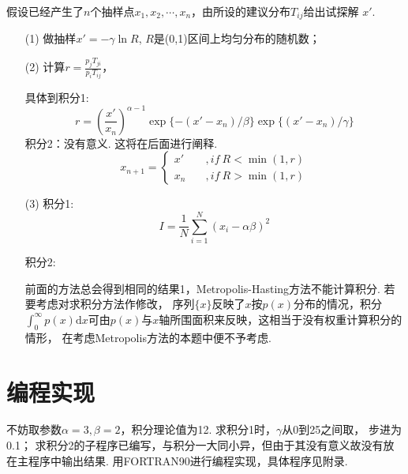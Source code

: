 \documentclass[12pt,a4paper,utf8]{ctexart}
\begin{document}
假设已经产生了$n$个抽样点$x_1,x_2,\cdots,x_n$，由所设的建议分布$T_{ij}$给出试探解
$x'$.
\begin{enumerate}
    \item[(1)] 做抽样$x'=-\gamma \ln R$, $R$是(0,1)区间上均匀分布的随机数；
    \item[(2)] 计算$r= \frac{p_jT_{ji}}{p_iT_{ij}}$，

        具体到积分1:
        \begin{equation}
            r = \left( \frac{x'}{x_n}\right)^{\alpha-1}\exp\{-(x'-x_n)/\beta\}
            \exp\{(x'-x_n)/\gamma\}
        \end{equation}
        积分2：没有意义. 这将在后面进行阐释. 
        \begin{equation}
            x_{n+1} = 
            \begin{cases}
                x' \quad&,if~R<\min(1,r)\\
                x_n \quad&,if~ R>\min(1,r)
            \end{cases}
        \end{equation}

    \item[(3)] 
        积分1:
        \begin{equation}
            I= \frac{1}{N} \sum _{i=1} ^N (x_i-\alpha \beta)^2
        \end{equation}

        积分2:

        前面的方法总会得到相同的结果1，Metropolis-Hasting方法不能计算积分.
        若要考虑对求积分方法作修改，
        序列$\{x\}$反映了$x$按$p(x)$分布的情况，积分$\int _0 ^{\infty} p(x)
        \textrm{d}x$可由$p(x)$与$x$轴所围面积来反映，这相当于没有权重计算积分的情形，
        在考虑Metropolis方法的本题中便不予考虑. 
\end{enumerate}
\section{编程实现}

不妨取参数$\alpha = 3,\beta = 2$，积分理论值为12. 求积分1时，$\gamma$从0到25之间取，
步进为0.1；
求积分2的子程序已编写，与积分一大同小异，但由于其没有意义故没有放在主程序中输出结果.
用FORTRAN90进行编程实现，具体程序见附录. 
\end{document}
